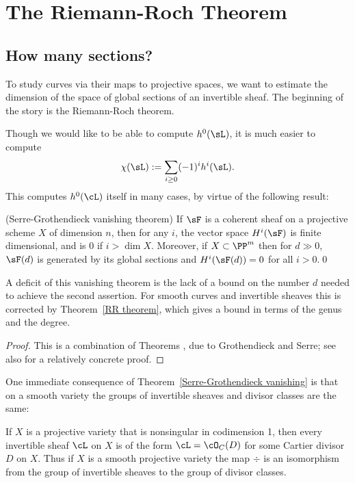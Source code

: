 

\chapter{The Riemann-Roch Theorem}\label{RiemannRochChapter}

\section{How many sections?}

To study curves via their maps to projective spaces, we want to estimate the dimension of the space of global
sections of an invertible sheaf. The beginning
of the story is the Riemann-Roch theorem.

Though we would like to be able to compute  $h^0(\sL)$, it is much easier to compute
$$
\chi(\sL):= \sum_{i\geq 0} (-1)^i h^i(\sL).
$$
This computes $h^0(\cL)$ itself in many cases, by virtue of the following result:

\begin{theorem} (Serre-Grothendieck vanishing theorem)\label{Serre-Grothendieck vanishing}
If $\sF$ is a coherent sheaf on a projective scheme $X$ of dimension $n$, then for any $i$, the vector space $H^i(\sF)$ is finite dimensional, and is 0 if  $i>\dim X$. Moreover,
if $X\subset \PP^m$ then for $d\gg 0$, $\sF(d)$ is generated by its global sections and $H^i(\sF(d)) = 0$ for all $i>0$.\qed
\end{theorem}

A deficit of this vanishing theorem is the lack of a bound on the number $d$ needed to achieve the second assertion. For smooth curves
and invertible sheaves
this is corrected by Theorem~\ref{RR theorem}, which gives a bound in terms of the genus and the degree.

\begin{proof}
This is a combination of Theorems \cite[Theorems III.2.7 and III.5.2]{Hartshorne1977}, due to Grothendieck and Serre; see also \cite{Serre1955} for a relatively concrete proof.
\end{proof}

One immediate consequence of Theorem~\ref{Serre-Grothendieck vanishing} is that on a smooth variety the groups of invertible sheaves and divisor classes are the same:

\begin{corollary}\label{invertible sheaves and divisors}
If $X$ is a projective variety that is nonsingular in codimension 1, then every invertible sheaf $\cL$ on $X$ is of the form $\cL = \cO_C(D)$ for some Cartier divisor $D$ on $X$. Thus if $X$ is a smooth projective variety the map $\div$ is an isomorphism from the group of invertible sheaves to the group
of divisor classes.
\end{corollary}

